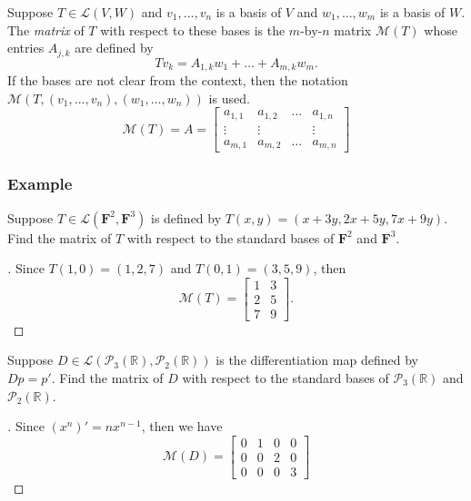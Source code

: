 \documentclass[11pt]{article}
\begin{document}
    Suppose \(T \in \mathcal{L}(V,W)\) and \(v_1, \dots, v_n\) is a basis of $V$ and \(w_1, \dots, w_m\) is a basis of $W$. The \emph{matrix} of $T$ with respect to these bases is the $m$-by-$n$ matrix \(\mathcal{M}(T)\) whose entries \(A_{j,k}\) are defined by \[Tv_k = A_{1,k} w_1 + \dots + A_{m,k} w_m.\] If the bases are not clear from the context, then the notation \(\mathcal{M}(T,(v_1, \dots, v_n),(w_1, \dots, w_n))\) is used.
    \begin{equation*}
        \mathcal{M}(T) = A = \begin{bmatrix}
                                a_{1,1} & a_{1,2} & \dots & a_{1,n} \\
                                \vdots  &  \vdots     &       &   \vdots \\
                                a_{m,1} & a_{m,2} & \dots & a_{m,n}
                             \end{bmatrix}
    \end{equation*}

    \subsubsection{Example}
    Suppose \(T \in \mathcal{L}(\textbf{F}^2, \textbf{F}^3)\) is defined by \(T(x,y) = (x+3y, 2x+5y, 7x + 9y).\) Find the matrix of $T$ with respect to the standard bases of \(\textbf{F}^2\) and \(\textbf{F}^3\). 

    \begin{proof}[\unskip\nopunct]
        Since \(T(1,0) = (1,2,7)\) and \(T(0,1) = (3,5,9)\), then
        \begin{equation*}
            \mathcal{M}(T) = \begin{bmatrix}
                               1 & 3 \\
                               2 & 5 \\
                               7 & 9
                             \end{bmatrix}.
        \end{equation*}
    \end{proof}
    Suppose \(D \in \mathcal{L}(\mathcal{P}_3 (\mathbb{R}), \mathcal{P}_2 (\mathbb{R}))\) is the differentiation map defined by \(Dp = p'\). Find the matrix of $D$ with respect to the standard bases of \(\mathcal{P}_3 (\mathbb{R})\) and \(\mathcal{P}_2 (\mathbb{R})\).

    \begin{proof}[\unskip\nopunct]
        Since \((x^n)' = nx^{n-1}\), then we have
        \begin{equation*}
            \mathcal{M}(D) = \begin{bmatrix}
                                0 & 1 & 0 & 0 \\
                                0 & 0 & 2 & 0 \\
                                0 & 0 & 0 & 3
                             \end{bmatrix}
        \end{equation*}
    \end{proof}
\end{document}
